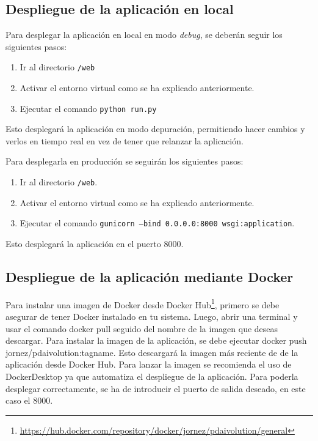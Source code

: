 \subsection{Despliegue de la aplicación en local}

Para desplegar la aplicación en local en modo \textit{debug}, se deberán seguir los siguientes pasos:

\begin{enumerate}
\item Ir al directorio \texttt{/web}
\item Activar el entorno virtual como se ha explicado anteriormente.
\item Ejecutar el comando \texttt{python run.py}
\end{enumerate}

Esto desplegará la aplicación en modo depuración, permitiendo hacer cambios y verlos en tiempo real en vez de tener que relanzar la aplicación.

Para desplegarla en producción se seguirán los siguientes pasos:
\begin{enumerate}
\item Ir al directorio \texttt{/web}.
\item Activar el entorno virtual como se ha explicado anteriormente.
\item Ejecutar el comando \texttt{gunicorn --bind 0.0.0.0:8000 wsgi:application}.
\end{enumerate}

Esto desplegará la aplicación en el puerto 8000.

\subsection{Despliegue de la aplicación mediante Docker}


Para instalar una imagen de Docker desde Docker Hub\footnote{\url{https://hub.docker.com/repository/docker/jornez/pdaivolution/general}}, primero se debe asegurar de tener Docker instalado en tu sistema. Luego, abrir una terminal y usar el comando docker pull seguido del nombre de la imagen que deseas descargar. Para instalar la imagen de la aplicación, se debe ejecutar docker push jornez/pdaivolution:tagname. Esto descargará la imagen más reciente de de la aplicación desde Docker Hub. Para lanzar la imagen se recomienda el uso de DockerDesktop ya que automatiza el despliegue de la aplicación. Para poderla desplegar correctamente, se ha de introducir el puerto de salida deseado, en este caso el 8000.

